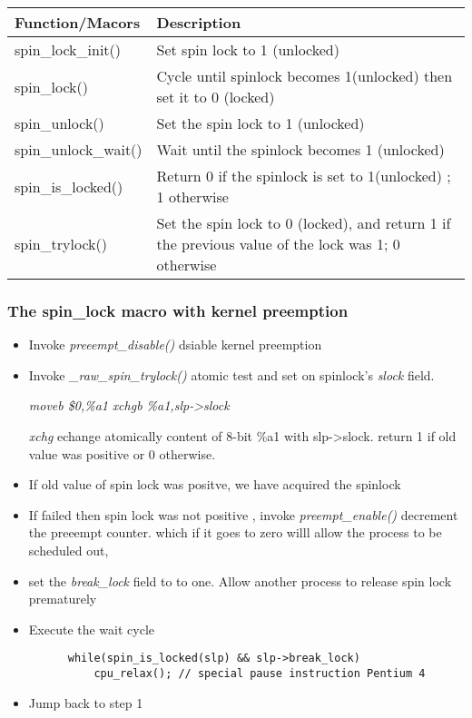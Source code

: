 \documentclass{article}
\begin{document}
  \begin{center}
  \begin{tabular}{ l | l }    
    \hline
    Function/Macors & Description \\ \hline
    spin\_lock\_init() & Set spin lock to 1 (unlocked) \\ 
    spin\_lock() & Cycle until spinlock becomes 1(unlocked) then set it to 0 (locked) \\ 
    spin\_unlock() & Set the spin lock to 1 (unlocked) \\
    spin\_unlock\_wait() & Wait until the spinlock becomes 1 (unlocked)  \\
    spin\_is\_locked() & Return 0 if the spinlock is set to 1(unlocked) ; 1 otherwise  \\
    spin\_trylock() &  Set the spin lock to 0 (locked), and return 1 if the previous value of the lock was 1; 0 otherwise\\
    \hline
  \end{tabular}
  \end{center}

  \subsubsection{The spin\_lock macro with kernel preemption}

  \begin{itemize}
    \item Invoke \emph{preeempt\_disable()} dsiable kernel preemption
    \item Invoke \emph{\_raw\_spin\_trylock()} atomic test and set on
      spinlock's \emph{slock} field.

      \emph{moveb \$0,\%a1}
      \emph{xchgb \%a1,slp->slock}

      \emph{xchg} echange atomically content of 8-bit \%a1 with slp->slock.
      return 1 if old value was positive or 0 otherwise.

    \item If old value of spin lock was positve, we have acquired the spinlock
        
    \item If failed then spin lock was not positive , invoke
      \emph{preempt\_enable()} decrement the preeempt counter. which
      if it goes to zero willl allow the process to be scheduled out,

    \item set the \emph{break\_lock} field to to one. Allow another
      process to release spin lock prematurely

    \item Execute the wait cycle
      \begin{lstlisting}
      while(spin_is_locked(slp) && slp->break_lock)
          cpu_relax(); // special pause instruction Pentium 4
      \end{lstlisting}
    \item Jump back to step 1 
      
  \end{itemize}
\end{document}
